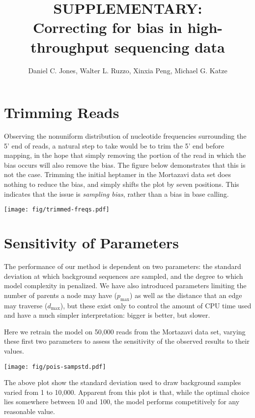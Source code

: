 \documentclass[letterpaper]{article}
\title{SUPPLEMENTARY:\\Correcting for bias in high-throughput sequencing data}
\author{Daniel C. Jones, Walter L. Ruzzo, Xinxia Peng, Michael G. Katze}
\begin{document}


\section{Trimming Reads}

Observing the nonuniform distribution of nucleotide frequencies surrounding the
5' end of reads, a natural step to take would be to trim the 5' end before mapping,
in the hope that simply removing the portion of the read in which the bias
occurs will also remove the bias. The figure below demonstrates that this is not
the case. Trimming the initial heptamer in the Mortazavi data set does nothing to
reduce the bias, and simply shifts the plot by seven positions. This indicates
that the issue is \emph{sampling bias}, rather than a bias in base calling.


\begin{center}
\texttt{[image: fig/trimmed-freqs.pdf]}
\end{center}


\section{Sensitivity of Parameters}

The performance of our method is dependent on two parameters: the standard
deviation at which background sequences are sampled, and the degree to which
model complexity in penalized. We have also introduced parameters limiting the
number of parents a node may have ($p_{\text{max}}$) as well as the distance
that an edge may traverse ($d_{\text{max}}$), but these exist only to control
the amount of CPU time used and have a much simpler interpretation: bigger is
better, but slower.

Here we retrain the model on 50,000 reads from the Mortazavi data
set, varying these first two parameters to assess the sensitivity of the
observed results to their values.

\begin{center}
\texttt{[image: fig/pois-sampstd.pdf]}
\end{center}

The above plot show the standard deviation used to draw background samples
varied from 1 to 10,000. Apparent from this plot is that, while the optimal
choice lies somewhere between 10 and 100, the model performs competitively for
any reasonable value.
\end{document}
